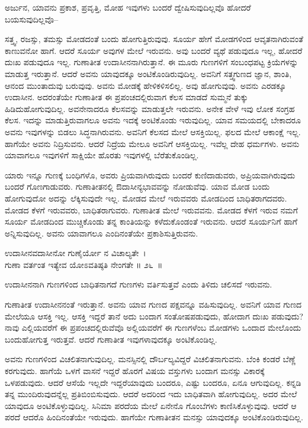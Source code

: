 \begin{artha}
ಅರ್ಜುನ, ಯಾವನು ಪ್ರಕಾಶ, ಪ್ರವೃತ್ತಿ, ಮೋಹ ಇವುಗಳು ಬಂದರೆ ದ್ವೇಷಿಸುವುದಿಲ್ಲವೊ ಹೋದರೆ ಬಯಸುವುದಿಲ್ಲವೊ--
\end{artha}

ಸತ್ತ್ವ, ರಜಸ್ಸು, ತಮಸ್ಸು ಮೋಡದಂತೆ ಬಂದು ಹೋಗುತ್ತಿರುವುವು. ಸೂರ್ಯ ಹೇಗೆ ಮೋಡಗಳಿಂದ ಆವೃತನಾಗಿರುವಂತೆ ಕಾಣುವನೋ ಹಾಗೆ. ಆದರೆ ಸೂರ್ಯ ಅವುಗಳ ಮೇಲೆ ಇರುವನು. ಅವು ಬಂದರೆ ವ್ಯಥೆ ಪಡುವುದೂ ಇಲ್ಲ, ಹೋದರೆ ದುಃಖ ಪಡುವುದೂ ಇಲ್ಲ. ಗುಣಾತೀತ ಉದಾಸೀನನಾಗಿರುತ್ತಾನೆ. ಈ ಮೂರು ಗುಣಗಳಿಗೆ ಸಂಬಂಧಪಟ್ಟ ಕ್ರಿಯೆಗಳನ್ನು ಮಾಡುತ್ತ ಇರುತ್ತಾನೆ. ಆದರೆ ಅವನು ಯಾವುದಕ್ಕೂ ಅಂಟಿಕೊಂಡಿರುವುದಿಲ್ಲ. ಅವನಿಗೆ ಸತ್ತ್ವಗುಣದ ಜ್ಞಾನ, ಶಾಂತಿ, ಆನಂದ ಮುಂತಾದುವು ಬರುವುವು. ಅವನು ಮೋಡಕ್ಕೆ ಹೇಳಿಕಳಿಸಲಿಲ್ಲ. ಅವು ಹೋಗುವುವು. ಅವನು ಎರಡಕ್ಕೂ ಉದಾಸೀನ. ಅದರಂತೆಯೇ ಗುಣಾತೀತ ಈ ಪ್ರಪಂಚದಲ್ಲಿರುವಾಗ ಕೆಲಸ ಮಾಡದೆ ಸುಮ್ಮನೆ ತುಕ್ಕು ಹಿಡಿದುಹೋಗುವುದಿಲ್ಲ. ಅವನೇನಾದರೂ ಕೆಲಸವನ್ನು ಮಾಡುತ್ತಲೇ ಇರುವನು. ಅನೇಕ ವೇಳೆ ಇವು ಲೋಕ ಸಂಗ್ರಹ ಕೆಲಸ. ಇದನ್ನು ಮಾಡುತ್ತಿರುವಾಗಲೂ ಅವನು ಇದಕ್ಕೆ ಅಂಟಿಕೊಂಡು ಇರುವುದಿಲ್ಲ. ಯಾವ ಸಮಯದಲ್ಲಿ ಬೇಕಾದರೂ ಅವನು ಇವುಗಳನ್ನು ಬಿಡಲು ಸಿದ್ಧನಾಗಿರುವನು. ಅವನಿಗೆ ಕೆಲಸದ ಮೇಲೆ ಆಸಕ್ತಿಯಿಲ್ಲ. ಫಲದ ಮೇಲೆ ಆಕಾಂಕ್ಷೆ ಇಲ್ಲ. ಹಾಗೆಯೇ ಅವನು ನಿದ್ರಿಸುವನು. ಆದರೆ ನಿದ್ರೆಯ ಮೇಲೂ ಅವನಿಗೆ ಆಸಕ್ತಿಯಿಲ್ಲ. ಇವೆಲ್ಲ ದೇಹ ಧರ್ಮಗಳು. ಅವನು ಯಾವಾಗಲೂ ಇವುಗಳಿಗೆ ಸಾಕ್ಷಿಯೇ ಹೊರತು ಇವುಗಳಲ್ಲಿ ಬೆರೆತುಕೊಂಡಿಲ್ಲ.

ಯಾರು ಇನ್ನೂ ಗುಣಕ್ಕೆ ಬಂಧಿಗಳೊ, ಅವರು ಪ್ರಿಯವಾಗಿರುವುದು ಬಂದರೆ ಕುಣಿದಾಡುವರು, ಅಪ್ರಿಯವಾಗಿರುವುದು ಬಂದರೆ ಗೊಣಗಾಡುವರು. ಗುಣಾತೀತನಲ್ಲಿ ಔದಾಸೀನ್ಯಭಾವವನ್ನು ನೋಡುವೆವು. ಯಾವ ಮೋಡ ಬಂದು ಹೋಗುವುದೋ ಅದನ್ನು ಲೆಕ್ಕಿಸುವುದೇ ಇಲ್ಲ. ಮೋಡದ ಮೇಲೆ ಇರುವವರು ಮೋಡದಿಂದ ಬಾಧಿತರಾಗದವರು. ಮೋಡದ ಕೆಳಗೆ ಇರುವವರು, ಬಾಧಿತರಾಗುವರು. ಗುಣಾತೀತ ಮೇಲೆ ಇರುವವನು. ಮೋಡದ ಕೆಳಗೆ ಇರುವ ನಮಗೆ ಸೂರ್ಯ ಮೋಡದಿಂದ ಮುಚ್ಚಿಕೊಂಡು ತನ್ನ ಕಾಂತಿಯನ್ನು ಕಳೆದುಕೊಂಡಂತೆ ಇರುವನು. ಆದರೆ ಸೂರ್ಯನಿಗೆ ಹಾಗೆ ಅನ್ನಿಸುವುದಿಲ್ಲ. ಅವನು ಯಾವಾಗಲೂ ಎಂದಿನಂತೆಯೇ ಪ್ರಕಾಶಿಸುತ್ತಿರುವನು.

\begin{shloka}
ಉದಾಸೀನವದಾಸೀನೋ ಗುಣೈರ್ಯೋ ನ ವಿಚಾಲ್ಯತೇ~।\\ಗುಣಾ ವರ್ತಂತ ಇತ್ಯೇವ ಯೋಽವತಿಷ್ಠತಿ ನೇಂಗತೇ \hfill॥ ೨೬~॥
\end{shloka}

\begin{artha}
ಉದಾಸೀನನಾಗಿ ಗುಣಗಳಿಂದ ಬಾಧಿತನಾಗದೆ ಗುಣಗಳು ವರ್ತಿಸುತ್ತವೆ ಎಂದು ತಿಳಿದು ಚಲಿಸದೆ ಇರುವನು.
\end{artha}

ಗುಣಾತೀತ ಉದಾಸೀನನಂತೆ ಇರುತ್ತಾನೆ. ಅವನು ಯಾವ ಗುಣದ ಪಕ್ಷವನ್ನೂ ವಹಿಸುವುದಿಲ್ಲ. ಅವನಿಗೆ ಯಾವ ಗುಣದ ಮೇಲೆಯೂ ಆಸಕ್ತಿ ಇಲ್ಲ. ಆಸಕ್ತಿ ಇದ್ದರೆ ತಾನೆ ಅದು ಬಂದಾಗ ಸಂತೋಷಪಡುವುದು, ಹೋದಾಗ ದುಃಖ ಪಡುವುದು? ನಾವು ಎಲ್ಲಿಯವರೆಗೆ ಈ ಪ್ರಪಂಚದಲ್ಲಿರುವೆವೊ ಅಲ್ಲಿಯವರೆಗೆ ಈ ಗುಣಗಳೆಂಬ ಮೋಡಗಳು ಒಂದಾದ ಮೇಲೊಂದು ಬಂದುಹೋಗುತ್ತ ಇರುತ್ತವೆ. ಆದರೆ ಗುಣಾತೀತ ಇವುಗಳಾವುದಕ್ಕೂ ಅಂಟಿಕೊಂಡಿಲ್ಲ.

ಅವನು ಗುಣಗಳಿಂದ ವಿಚಲಿತನಾಗುವುದಿಲ್ಲ. ಮನಸ್ಸಿನಲ್ಲಿ ದೌರ್ಬಲ್ಯವಿದ್ದರೆ ವಿಚಲಿತ\-ನಾಗುವನು. ಬೆಂಕಿ ಕಂಡರೆ ಬೆಣ್ಣೆ ಕರಗುವುದು. ಹಾಗೆಯೆ ಒಳಗೆ ವಾಸನೆ ಇದ್ದರೆ ಹೊರಗೆ ವಿಷಯ ವಸ್ತುಗಳು ಬಂದಾಗ ಮನಸ್ಸು ವಿಕಾರಕ್ಕೆ ಒಳಪಡುವುದು. ಆದರೆ ಆಸೆಯೆ ಇಲ್ಲದೇ ಇದ್ದರೆ\break ಯಾವುದು ಬಂದರೂ, ಎಷ್ಟು ಬಂದರೂ, ಏನೂ ಆಗುವುದಿಲ್ಲ. ಕನ್ನಡಿ ತನ್ನ ಮುಂದಿರುವುದನ್ನೆಲ್ಲ ಪ್ರತಿಬಿಂಬಿಸುವುದು. ಆದರೆ ಅದರಿಂದ ಇದು ಬಾಧಿತವಾಗಿ ಹೋಗುವುದಿಲ್ಲ. ಅದರ ಮೇಲೆ ಯಾವುದೂ ಅಂಟಿಕೊಳ್ಳುವುದಿಲ್ಲ. ಸಿನಿಮಾ ಪರದೆಯ ಮೇಲೆ ಏನೇನೊ ಗೊಂಬೆಗಳು ಕಾಣಿಸಿ\-ಕೊಳ್ಳುವುವು. ಆದರೆ ಆ ಪರದೆ ಆದರೊ ಹಿಂದಿನಂತೆಯೇ ಇರುವುದು. ಹಾಗೆಯೇ ಗುಣಾತೀತನ ಮನಸ್ಸು ಯಾವುದಕ್ಕೂ ಅಂಟಿಕೊಂಡಿರುವುದಿಲ್ಲ.

